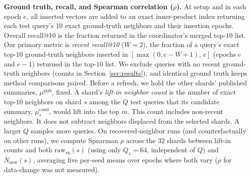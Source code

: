 \textbf{Ground truth, recall, and Spearman correlation ($\rho$).} At setup and in each epoch $e$, all inserted vectors are added to an exact inner-product index \cite{douze2024faiss} returning each test query's $10$ exact ground-truth neighbors and their insertion epochs. Overall recall@10 is the fraction returned in the coordinator's merged top-$10$ list. Our primary metric is \emph{recent recall@10} ($W = 2$), the fraction of a query's exact top-$10$ ground-truth neighbors inserted in $[\max(0, e - W + 1),\, e]$ (epochs $e$ and $e - 1$) returned in the top-$10$ list. We exclude queries with no recent ground-truth neighbors (counts in Section~\ref{sec:results}), and identical ground truth keeps method comparisons paired. Before a refresh, we hold the other shards' published summaries, $\mu^{\text{pub}}$, fixed. A shard's \emph{lift-in neighbor count} is the number of exact top-$10$ neighbors on shard $s$ among the $Q$ test queries that its candidate summary, $\mu_s^{\text{cand}}$, would lift into the top $m$. This count includes non-recent neighbors. It does not subtract neighbors displaced from the selected shards. A larger $Q$ samples more queries. On recovered-neighbor runs (and counterfactually on other runs), we compute Spearman $\rho$ across the $32$ shards between lift-in counts and both $\text{raw}_{\text{rn}}(s)$ (using only $Q_s = 64$, independent of $Q$) and $N_{\text{new}}(s)$, averaging five per-seed means over epochs where both vary ($\rho$ for data-change was not measured).

